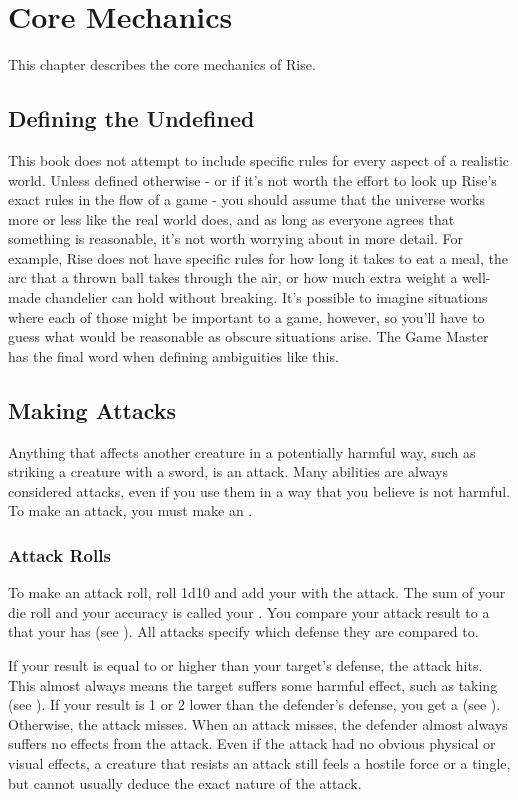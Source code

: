\chapter{Core Mechanics}

This chapter describes the core mechanics of Rise.

\section{Defining the Undefined}
    This book does not attempt to include specific rules for every aspect of a realistic world.
    Unless defined otherwise - or if it's not worth the effort to look up Rise's exact rules in the flow of a game - you should assume that the universe works more or less like the real world does, and as long as everyone agrees that something is reasonable, it's not worth worrying about in more detail.
    For example, Rise does not have specific rules for how long it takes to eat a meal, the arc that a thrown ball takes through the air, or how much extra weight a well-made chandelier can hold without breaking.
    It's possible to imagine situations where each of those might be important to a game, however, so you'll have to guess what would be reasonable as obscure situations arise.
    The Game Master has the final word when defining ambiguities like this.

\section{Making Attacks}\label{Attacks}
    Anything that affects another creature in a potentially harmful way, such as striking a creature with a sword, is an attack.
    Many abilities are always considered attacks, even if you use them in a way that you believe is not harmful.
    To make an attack, you must make an .

    \subsection{Attack Rolls}\label{Attack Rolls}
        To make an attack roll, roll 1d10 and add your  with the attack.
        The sum of your die roll and your accuracy is called your .
        You compare your attack result to a  that your  has (see ).
        All attacks specify which defense they are compared to.

        If your result is equal to or higher than your target's defense, the attack hits.
        This almost always means the target suffers some harmful effect, such as taking  (see ).
        If your result is 1 or 2 lower than the defender's defense, you get a  (see ).
        Otherwise, the attack misses.
        When an attack misses, the defender almost always suffers no effects from the attack.
        Even if the attack had no obvious physical or visual effects, a creature that resists an attack still feels a hostile force or a tingle, but cannot usually deduce the exact nature of the attack.

